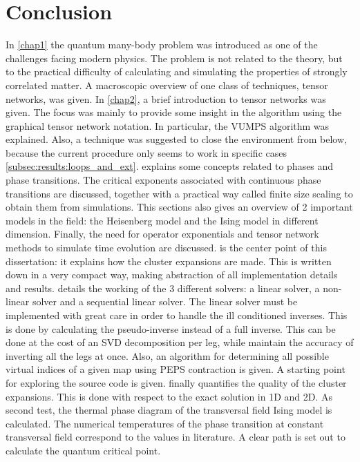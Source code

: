 \section{Conclusion}

In \cref{chap1} the quantum many-body problem was introduced as one of the challenges facing modern physics. The problem is not related to the theory, but to the practical difficulty of calculating and simulating the properties of strongly correlated matter. A macroscopic overview of one class of techniques, tensor networks, was given.
In \cref{chap2}, a brief introduction to tensor networks was given. The focus was mainly to provide some insight in the algorithm using the graphical tensor network notation. In particular, the VUMPS algorithm was explained. Also, a technique was suggested to close the environment from below, because the current procedure only seems to work in specific cases \cref{subsec:results:loops_and_ext}.
 explains some concepts related to phases and phase transitions. The critical exponents associated with continuous phase transitions are discussed, together with a practical way called finite size scaling to obtain them from simulations. This sections also gives an overview of 2 important models in the field: the Heisenberg model and the Ising model in different dimension. Finally, the need for operator exponentials and tensor network methods to simulate time evolution are discussed.
 is the center point of this dissertation: it explains how the cluster expansions are made. This is written down in a very compact way, making abstraction of all implementation details and results.
 details the working of the 3 different solvers: a linear solver, a non-linear solver and a sequential linear solver. The linear solver must be implemented with great care in order to handle the ill conditioned inverses. This is done by calculating the pseudo-inverse instead of a full inverse. This can be done at the cost of an SVD decomposition per leg, while maintain the accuracy of inverting all the legs at once. Also, an algorithm for determining all possible virtual indices of a given map using PEPS contraction is given.  A starting point for exploring the source code is given.
 finally quantifies the quality of the cluster expansions. This is done with respect to the exact solution in 1D and 2D. As second test, the thermal phase diagram of the transversal field Ising model is calculated. The numerical temperatures of the phase transition at constant transversal field correspond to the values in literature. A clear path is set out to calculate the quantum critical point.

